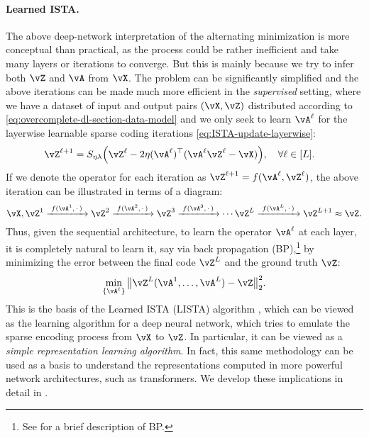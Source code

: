 \documentclass[../../book-main.tex]{subfiles}
\begin{document}
\paragraph{Learned ISTA.} The above deep-network  interpretation of the
alternating minimization is more conceptual than practical, as the process could
be rather inefficient and take many layers or iterations to converge. 
But this
is mainly because we try to infer both \(\vZ\) and \(\vA\) from \(\vX\). 
The problem can be significantly simplified and the above iterations can be made
much more efficient in the \textit{supervised} setting, where we have a dataset of input
and output pairs \((\vX, \vZ)\) distributed according to
\eqref{eq:overcomplete-dl-section-data-model} and we only seek to learn
\(\vA^\ell\) for the layerwise learnable sparse coding iterations
\eqref{eq:ISTA-update-layerwise}:
\begin{align}
    & \vZ^{\ell + 1} = S_{\eta\lambda}\rp{\vZ^{\ell} - 2\eta(\vA^{\ell})^{\top}(\vA^\ell\vZ^{\ell} - \vX)}, \quad \forall \ell \in [L].
\end{align}
If we denote the operator for each iteration as $\vZ^{\ell + 1} = f(\vA^\ell, \vZ^\ell)$, the above iteration can be illustrated in terms of a diagram:
\begin{equation*}
\vX, \vZ^1 \xrightarrow{\hspace{1mm} f(\vA^1,\,\cdot\,) \hspace{1mm}}  \vZ^2 \xrightarrow{\hspace{1mm} f(\vA^2,\,\cdot\,) \hspace{1mm}}  \vZ^3  \xrightarrow{\hspace{1mm} f(\vA^3,\,\cdot\,) \hspace{1mm}} \cdots \vZ^{L}  \xrightarrow{\hspace{1mm} f(\vA^{L},\,\cdot\,) \hspace{1mm}} \vZ^{L + 1} \approx \vZ.  
\label{eqn:deep-sparse-encoding}
\end{equation*}
Thus, given the sequential architecture, to learn the operator \(\vA^\ell\) at
each layer, it is completely natural to learn it, say via back propagation
(BP),\footnote{See  for a brief description of BP.} by minimizing the error between the final code $\vZ^L$ and the ground truth $\vZ$:
\begin{equation}\label{eq:lista-training}
    \min_{\{\vA^\ell\}} \big\|\vZ^L(\vA^1, \ldots, \vA^{L}) - \vZ\big\|_2^2.
\end{equation}
This is the basis of the Learned ISTA (LISTA) algorithm \cite{gregor2010learning}, which can be viewed as the learning algorithm for a deep  neural network, which tries to emulate the sparse encoding process from $\vX$ to $\vZ$. In particular, it can be viewed as a \textit{simple representation learning algorithm}. 
In fact, this same methodology can be used as a basis to understand the
representations computed in more powerful network architectures, such as
transformers. We develop these implications in detail in .
\end{document}
